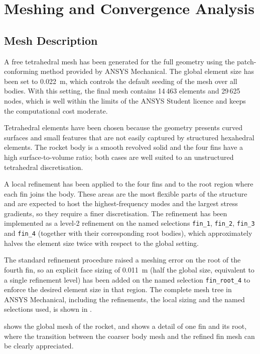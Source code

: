 \section{Meshing and Convergence Analysis}
\label{sec:mesh_convergence}

\subsection{Mesh Description}

A free tetrahedral mesh has been generated for the full geometry using the patch-conforming method provided by ANSYS Mechanical. The global element size has been set to \SI{0.022}{\metre}, which controls the default seeding of the mesh over all bodies. With this setting, the final mesh contains 14\,463 elements and 29\,625 nodes, which is well within the limits of the ANSYS Student licence and keeps the computational cost moderate.

Tetrahedral elements have been chosen because the geometry presents curved surfaces and small features that are not easily captured by structured hexahedral elements. The rocket body is a smooth revolved solid and the four fins have a high surface-to-volume ratio; both cases are well suited to an unstructured tetrahedral discretisation.

A local refinement has been applied to the four fins and to the root region where each fin joins the body. These areas are the most flexible parts of the structure and are expected to host the highest-frequency modes and the largest stress gradients, so they require a finer discretisation. The refinement has been implemented as a level-2 refinement on the named selections \texttt{fin\_1}, \texttt{fin\_2}, \texttt{fin\_3} and \texttt{fin\_4} (together with their corresponding root bodies), which approximately halves the element size twice with respect to the global setting.

The standard refinement procedure raised a meshing error on the root of the fourth fin, so an explicit face sizing of \SI{0.011}{\metre} (half the global size, equivalent to a single refinement level) has been added on the named selection \texttt{fin\_root\_4} to enforce the desired element size in that region. The complete mesh tree in ANSYS Mechanical, including the refinements, the local sizing and the named selections used, is shown in .

 shows the global mesh of the rocket, and  shows a detail of one fin and its root, where the transition between the coarser body mesh and the refined fin mesh can be clearly appreciated.


